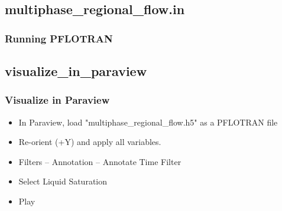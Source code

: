 \documentclass{beamer}
\begin{document}
\subsection{multiphase_regional_flow.in}

\begin{frame}[fragile]\frametitle{Running PFLOTRAN}


\end{frame}

\subsection{visualize_in_paraview}

\begin{frame}[fragile]\frametitle{Visualize in Paraview}

\begin{itemize}
\item In Paraview, load "multiphase\_regional\_flow.h5" as a PFLOTRAN file
\item Re-orient (+Y) and apply all variables.
\item Filters --  Annotation -- Annotate Time Filter
\item Select Liquid Saturation
\item Play
\end{itemize}

\end{frame}
\end{document}

